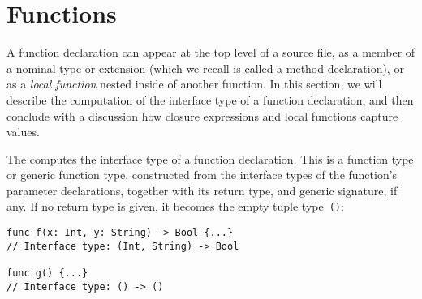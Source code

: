 \documentclass[../generics]{subfiles}
\begin{document}
\section{Functions}\label{function decls}

A function declaration can appear at the top level of a source file, as a member of a nominal type or extension (which we recall is called a method declaration), or as a \emph{local function} nested inside of another function. In this section, we will describe the computation of the interface type of a function declaration, and then conclude with a discussion how closure expressions and local functions capture values.

The  computes the interface type of a function declaration. This is a function type or generic function type, constructed from the interface types of the function's parameter declarations, together with its return type, and generic signature, if any. If no return type is given, it becomes the empty tuple type~\texttt{()}:
\begin{Verbatim}
func f(x: Int, y: String) -> Bool {...}
// Interface type: (Int, String) -> Bool

func g() {...}
// Interface type: () -> ()
\end{Verbatim}
\end{document}
